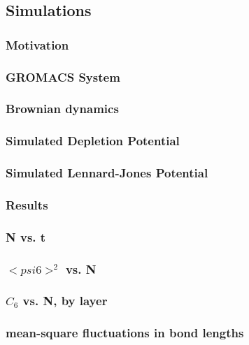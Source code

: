 \documentclass{article}
\begin{document}
{\subsection{Simulations}

\subsubsection{Motivation}

\subsubsection{GROMACS System}

\subsubsection{Brownian dynamics}

\subsubsection{Simulated Depletion Potential}

\subsubsection{Simulated Lennard-Jones Potential}

\subsubsection{Results}



\subsubsection{ N vs. t}

\subsubsection{ $< psi6 >^2$ vs. N}

\subsubsection{ $C_6$ vs. N, by layer}

\subsubsection{ mean-square fluctuations in bond lengths}

}
\end{document}
